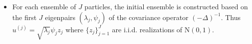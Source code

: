 \documentclass[10pt,a4paper]{article}
\begin{document}
\begin{itemize}
    \item For each ensemble of $J$ particles, the initial ensemble is constructed based on the 
    first $J$ eigenpairs $(\lambda_j, \psi_j)$ of the covariance operator $(-\Delta)^{-1}$. Thus
    $u^{(j)} = \sqrt{\lambda_j}\psi_j z_j$ where $\{z_j\}_{j=1} ^J$ are i.i.d. realizations of $\text{N}(0, 1)$. 
\end{itemize}




\end{document}
